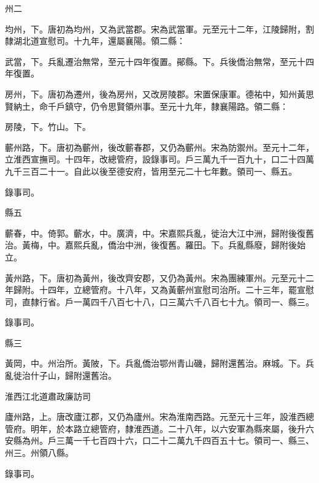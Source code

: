 \begin{pinyinscope}
 州二



 均州，下。唐初為均州，又為武當郡。宋為武當軍。元至元十二年，江陵歸附，割隸湖北道宣慰司。十九年，還屬襄陽。領二縣：



 武當，下。兵亂遷治無常，至元十四年復置。鄖縣。下。兵後僑治無常，至元十四年復置。



 房州，下。唐初為遷州，後為房州，又改房陵郡。宋置保康軍。德祐中，知州黃思賢納土，命千戶鎮守，仍令思賢領州事。至元十九年，隸襄陽路。領二縣：



 房陵，下。竹山。下。



 蘄州路，下。唐初為蘄州，後改蘄春郡，又仍為蘄州。宋為防禦州。至元十二年，立淮西宣撫司。十四年，改總管府，設錄事司。戶三萬九千一百九十，口二十四萬九千三百二十一。自此以後至德安府，皆用至元二十七年數。領司一、縣五。



 錄事司。



 縣五



 蘄春，中。倚郭。蘄水，中。廣濟，中。宋嘉熙兵亂，徙治大江中洲，歸附後復舊治。黃梅，中。嘉熙兵亂，僑治中洲，後復舊。羅田。下。兵亂縣廢，歸附後始立。



 黃州路，下。唐初為黃州，後改齊安郡，又仍為黃州。宋為團練軍州。元至元十二年歸附。十四年，立總管府。十八年，又為黃蘄州宣慰司治所。二十三年，罷宣慰司，直隸行省。戶一萬四千八百七十八，口三萬六千八百七十九。領司一、縣三。



 錄事司。



 縣三



 黃岡，中。州治所。黃陂，下。兵亂僑治鄂州青山磯，歸附還舊治。麻城。下。兵亂徙治什子山，歸附還舊治。



 淮西江北道肅政廉訪司



 廬州路，上。唐改廬江郡，又仍為廬州。宋為淮南西路。元至元十三年，設淮西總管府。明年，於本路立總管府，隸淮西道。二十八年，以六安軍為縣來屬，後升六安縣為州。戶三萬一千七百四十六，口二十二萬九千四百五十七。領司一、縣三、州三。州領八縣。



 錄事司。




\end{pinyinscope}
